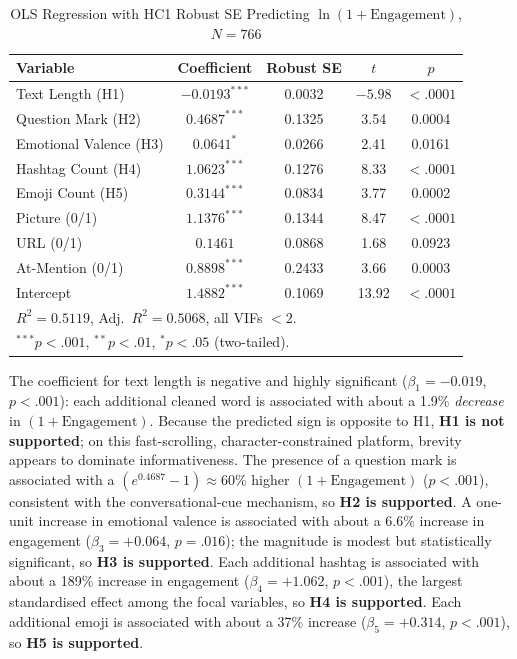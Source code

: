 \documentclass[12pt,a4paper]{article}
\begin{document}
\begin{table}[H]
\centering\small
\caption{OLS Regression with HC1 Robust SE Predicting $\ln(1+\text{Engagement})$, $N=766$}
\label{tab:reg}
\begin{tabular}{lcccc}
\toprule
Variable & Coefficient & Robust SE & $t$ & $p$ \\
\midrule
Text Length (H1) & $-0.0193^{***}$ & 0.0032 & $-5.98$ & $<.0001$ \\
Question Mark (H2) & $0.4687^{***}$ & 0.1325 & 3.54 & 0.0004 \\
Emotional Valence (H3) & $0.0641^{*}$ & 0.0266 & 2.41 & 0.0161 \\
Hashtag Count (H4) & $1.0623^{***}$ & 0.1276 & 8.33 & $<.0001$ \\
Emoji Count (H5) & $0.3144^{***}$ & 0.0834 & 3.77 & 0.0002 \\
Picture (0/1) & $1.1376^{***}$ & 0.1344 & 8.47 & $<.0001$ \\
URL (0/1) & $0.1461$ & 0.0868 & 1.68 & 0.0923 \\
At-Mention (0/1) & $0.8898^{***}$ & 0.2433 & 3.66 & 0.0003 \\
Intercept & $1.4882^{***}$ & 0.1069 & 13.92 & $<.0001$ \\
\midrule
\multicolumn{5}{l}{$R^2 = 0.5119$, Adj.\ $R^2 = 0.5068$, all VIFs $<2$.} \\
\multicolumn{5}{l}{$^{***}p<.001$, $^{**}p<.01$, $^{*}p<.05$ (two-tailed).} \\
\end{tabular}
\end{table}

The coefficient for text length is negative and highly significant ($\beta_1=-0.019$, $p<.001$): each additional cleaned word is associated with about a 1.9\% \emph{decrease} in $(1+\text{Engagement})$. Because the predicted sign is opposite to H1, \textbf{H1 is not supported}; on this fast-scrolling, character-constrained platform, brevity appears to dominate informativeness. The presence of a question mark is associated with a $(e^{0.4687}-1)\approx 60\%$ higher $(1+\text{Engagement})$ ($p<.001$), consistent with the conversational-cue mechanism, so \textbf{H2 is supported}. A one-unit increase in emotional valence is associated with about a 6.6\% increase in engagement ($\beta_3=+0.064$, $p=.016$); the magnitude is modest but statistically significant, so \textbf{H3 is supported}. Each additional hashtag is associated with about a 189\% increase in engagement ($\beta_4=+1.062$, $p<.001$), the largest standardised effect among the focal variables, so \textbf{H4 is supported}. Each additional emoji is associated with about a 37\% increase ($\beta_5=+0.314$, $p<.001$), so \textbf{H5 is supported}.
\end{document}
